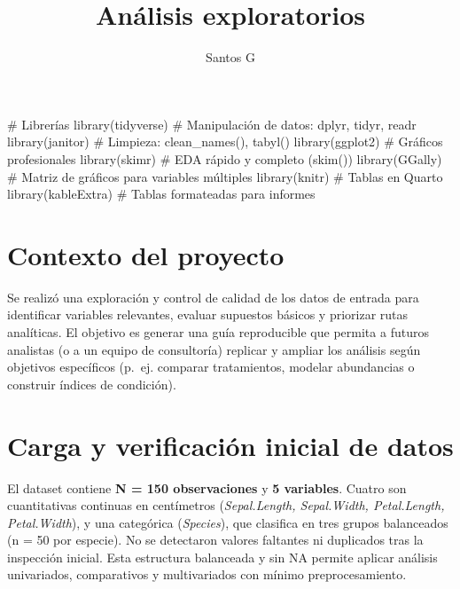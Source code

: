 \documentclass[
  spanish,
  11pt,
  a4paper,
  DIV=11,
  numbers=noendperiod]{scrartcl}
\title{Análisis exploratorios}
\author{Santos G}
\date{}
\newenvironment{Shaded}{\begin{snugshade}}{\end{snugshade}}
\newcommand{\CommentTok}[1]{\textcolor[rgb]{0.37,0.37,0.37}{#1}}
\newcommand{\FunctionTok}[1]{\textcolor[rgb]{0.28,0.35,0.67}{#1}}
\newcommand{\NormalTok}[1]{\textcolor[rgb]{0.00,0.23,0.31}{#1}}
\renewcommand*\contentsname{Tabla de contenidos}
\newcommand\contentsname{Tabla de contenidos}
\begin{document}
\maketitle

\renewcommand*\contentsname{Tabla de contenidos}
{
\hypersetup{linkcolor=}
\setcounter{tocdepth}{2}
\tableofcontents
}

\begin{Shaded}
\begin{Highlighting}[numbers=left,,]
\CommentTok{\# Librerías }
\FunctionTok{library}\NormalTok{(tidyverse)   }\CommentTok{\# Manipulación de datos: dplyr, tidyr, readr}
\FunctionTok{library}\NormalTok{(janitor)     }\CommentTok{\# Limpieza: clean\_names(), tabyl()}
\FunctionTok{library}\NormalTok{(ggplot2)     }\CommentTok{\# Gráficos profesionales}
\FunctionTok{library}\NormalTok{(skimr)       }\CommentTok{\# EDA rápido y completo (skim())}
\FunctionTok{library}\NormalTok{(GGally)      }\CommentTok{\# Matriz de gráficos para variables múltiples}
\FunctionTok{library}\NormalTok{(knitr)       }\CommentTok{\# Tablas en Quarto}
\FunctionTok{library}\NormalTok{(kableExtra)  }\CommentTok{\# Tablas formateadas para informes}
\end{Highlighting}
\end{Shaded}

\section{Contexto del proyecto}\label{contexto-del-proyecto}

Se realizó una exploración y control de calidad de los datos de entrada
para identificar variables relevantes, evaluar supuestos básicos y
priorizar rutas analíticas. El objetivo es generar una guía reproducible
que permita a futuros analistas (o a un equipo de consultoría) replicar
y ampliar los análisis según objetivos específicos (p.~ej. comparar
tratamientos, modelar abundancias o construir índices de condición).

\section{Carga y verificación inicial de
datos}\label{carga-y-verificaciuxf3n-inicial-de-datos}

El dataset contiene \textbf{N = 150 observaciones} y \textbf{5
variables}. Cuatro son cuantitativas continuas en centímetros
(\emph{Sepal.Length, Sepal.Width, Petal.Length, Petal.Width}), y una
categórica (\emph{Species}), que clasifica en tres grupos balanceados (n
= 50 por especie). No se detectaron valores faltantes ni duplicados tras
la inspección inicial. Esta estructura balanceada y sin NA permite
aplicar análisis univariados, comparativos y multivariados con mínimo
preprocesamiento.
\end{document}
